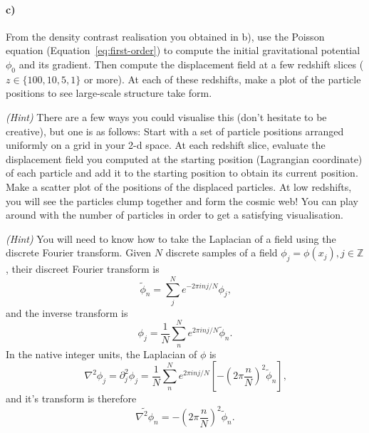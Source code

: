 \documentclass[12pt]{article}
\begin{document}
\paragraph{c)} From the density contrast realisation you obtained in b), use the
Poisson equation (Equation~\ref{eq:first-order}) to compute the initial
gravitational potential $\phi_0$ and its gradient. Then compute the
displacement field at a few redshift slices ($z \in \{100, 10, 5, 1\}$ or more).
At each of these redshifts, make a plot of the particle positions to see
large-scale structure take form.

\emph{(Hint)} There are a few ways you could visualise this (don't hesitate to be
creative), but one is as follows: Start with a set of particle positions
arranged uniformly on a grid in your 2-d space. At each redshift slice, evaluate
the displacement field you computed at the starting position (Lagrangian
coordinate) of each particle and add it to the starting position to obtain its
current position. Make a scatter plot of the positions of the displaced
particles. At low redshifts, you will see the particles clump together and form
the cosmic web! You can play around with the number of particles in order to get
a satisfying visualisation.

\emph{(Hint)} You will need to know how to take the Laplacian of a field using
the discrete Fourier transform. Given $N$ discrete samples of a field $\phi_j =
\phi(x_j), j \in \mathbb{Z}$, their discreet Fourier transform is
\begin{equation}
    \tilde{\phi}_n = \sum_j^N e^{-2 \pi i n j / N} \phi_j \text{,}
\end{equation}
and the inverse transform is
\begin{equation}
    \phi_j = \frac{1}{N}\sum_n^N e^{2 \pi i n j / N} \tilde{\phi}_n \text{.}
\end{equation}
In the native integer units, the Laplacian of $\phi$ is
\begin{equation}
    \nabla^2 \phi_j = \partial_j^2 \phi_j = \frac{1}{N}\sum_n^N e^{2 \pi i n j / N}
    \left[- \left(2 \pi \frac{n}{N}\right)^2 \tilde{\phi}_n \right] \text{,}
\end{equation}
and it's transform is therefore
\begin{equation}
    \tilde{\nabla^2 \phi}_n = - \left(2 \pi \frac{n}{N}\right)^2 \tilde{\phi}_n \text{.}
\end{equation}
\end{document}
